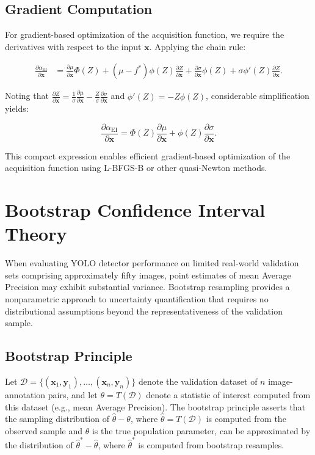 \subsection{Gradient Computation}

For gradient-based optimization of the acquisition function, we require the derivatives with respect to the input $\mathbf{x}$. Applying the chain rule:

\begin{align}
\frac{\partial \alpha_{\text{EI}}}{\partial \mathbf{x}} &= \frac{\partial \mu}{\partial \mathbf{x}} \Phi(Z) + (\mu - f^*) \phi(Z) \frac{\partial Z}{\partial \mathbf{x}} + \frac{\partial \sigma}{\partial \mathbf{x}} \phi(Z) + \sigma \phi'(Z) \frac{\partial Z}{\partial \mathbf{x}}.
\end{align}

Noting that $\frac{\partial Z}{\partial \mathbf{x}} = \frac{1}{\sigma} \frac{\partial \mu}{\partial \mathbf{x}} - \frac{Z}{\sigma} \frac{\partial \sigma}{\partial \mathbf{x}}$ and $\phi'(Z) = -Z \phi(Z)$, considerable simplification yields:

\begin{equation}
\frac{\partial \alpha_{\text{EI}}}{\partial \mathbf{x}} = \Phi(Z) \frac{\partial \mu}{\partial \mathbf{x}} + \phi(Z) \frac{\partial \sigma}{\partial \mathbf{x}}.
\end{equation}

This compact expression enables efficient gradient-based optimization of the acquisition function using L-BFGS-B or other quasi-Newton methods.

\section{Bootstrap Confidence Interval Theory}
\label{sec:bootstrap_derivation}

When evaluating YOLO detector performance on limited real-world validation sets comprising approximately fifty images, point estimates of mean Average Precision may exhibit substantial variance. Bootstrap resampling provides a nonparametric approach to uncertainty quantification that requires no distributional assumptions beyond the representativeness of the validation sample.

\subsection{Bootstrap Principle}

Let $\mathcal{D} = \{(\mathbf{x}_1, \mathbf{y}_1), \ldots, (\mathbf{x}_n, \mathbf{y}_n)\}$ denote the validation dataset of $n$ image-annotation pairs, and let $\theta = T(\mathcal{D})$ denote a statistic of interest computed from this dataset (e.g., mean Average Precision). The bootstrap principle asserts that the sampling distribution of $\hat{\theta} - \theta$, where $\hat{\theta} = T(\mathcal{D})$ is computed from the observed sample and $\theta$ is the true population parameter, can be approximated by the distribution of $\hat{\theta}^* - \hat{\theta}$, where $\hat{\theta}^*$ is computed from bootstrap resamples.

